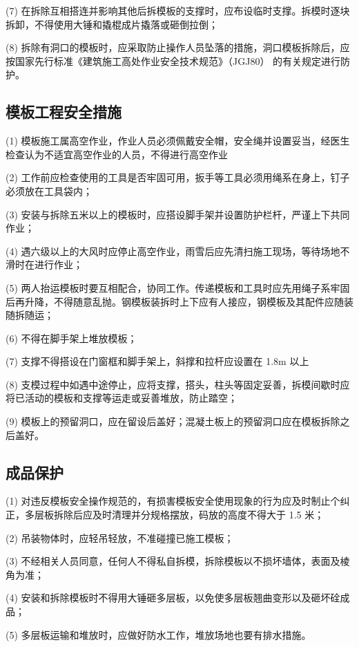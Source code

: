 (7) 在拆除互相搭连并影响其他后拆模板的支撑时，应布设临时支撑。拆模时逐块拆卸，不得使用大锤和撬棍成片撬落或砸倒拉倒；

(8) 拆除有洞口的模板时，应采取防止操作人员坠落的措施，洞口模板拆除后，应按国家先行标准《建筑施工高处作业安全技术规范》（JGJ80）
的有关规定进行防护。

\subsection{模板工程安全措施}

(1) 模板施工属高空作业，作业人员必须佩戴安全帽，安全绳并设置妥当，经医生检查认为不适宜高空作业的人员，不得进行高空作业

(2) 工作前应检查使用的工具是否牢固可用，扳手等工具必须用绳系在身上，钉子必须放在工具袋内；

(3) 安装与拆除五米以上的模板时，应搭设脚手架并设置防护栏杆，严谨上下共同作业；

(4) 遇六级以上的大风时应停止高空作业，雨雪后应先清扫施工现场，等待场地不滑时在进行作业；

(5) 两人抬运模板时要互相配合，协同工作。传递模板和工具时应先用绳子系牢固后再升降，不得随意乱抛。钢模板装拆时上下应有人接应，钢模板及其配件应随装随拆随运；

(6) 不得在脚手架上堆放模板；

(7) 支撑不得搭设在门窗框和脚手架上，斜撑和拉杆应设置在 1.8m 以上

(8) 支模过程中如遇中途停止，应将支撑，搭头，柱头等固定妥善，拆模间歇时应将已活动的模板和支撑等运走或妥善堆放，防止踏空；

(9) 模板上的预留洞口，应在留设后盖好；混凝土板上的预留洞口应在模板拆除之后盖好。

\subsection{成品保护}

(1) 对违反模板安全操作规范的，有损害模板安全使用现象的行为应及时制止个纠正，多层板拆除后应及时清理并分规格摆放，码放的高度不得大于 1.5 米；

(2) 吊装物体时，应轻吊轻放，不准碰撞已施工模板；

(3) 不经相关人员同意，任何人不得私自拆模，拆除模板以不损坏墙体，表面及棱角为准；

(4) 安装和拆除模板时不得用大锤砸多层板，以免使多层板翘曲变形以及砸坏硂成品；

(5) 多层板运输和堆放时，应做好防水工作，堆放场地也要有排水措施。

